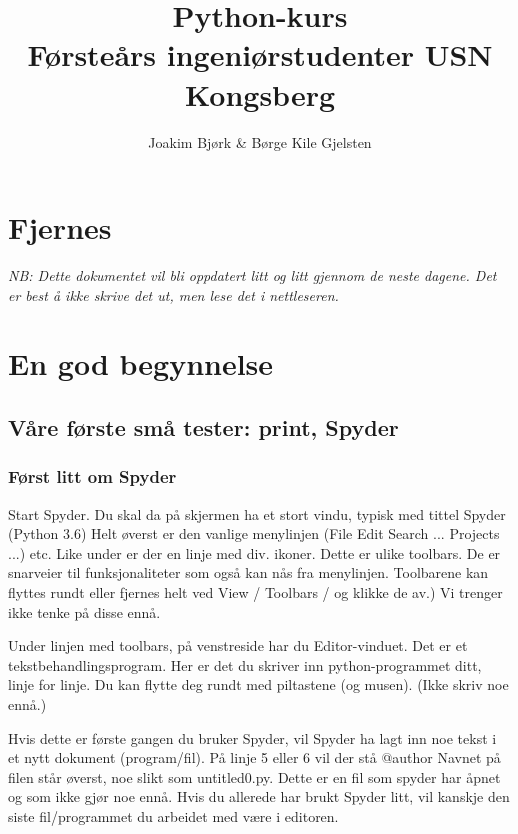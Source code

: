 \documentclass[a4paper,11pt,utf8]{book}
\begin{document}
\title{Python-kurs\\
Førsteårs ingeniørstudenter USN Kongsberg}
\author{Joakim Bjørk \& Børge Kile Gjelsten}
\maketitle
\newpage
\tableofcontents
\newpage


\newpage

\section*{Fjernes}
{\em
NB: Dette dokumentet vil bli oppdatert litt og litt gjennom de neste dagene.
Det er best å ikke skrive det ut, men lese det i nettleseren.

\bigskip
}

\section{En god begynnelse}
\subsection{Våre første små tester: print, Spyder}
\subsubsection*{Først litt om Spyder}
Start Spyder. Du skal da på skjermen ha et stort vindu, typisk med tittel Spyder (Python 3.6)
Helt øverst er den vanlige menylinjen (File Edit Search ... Projects ...) etc.
Like under er der en linje med div. ikoner. Dette er ulike toolbars.
De er snarveier til funksjonaliteter som også kan nås fra menylinjen. 
Toolbarene kan flyttes rundt eller fjernes helt ved View / Toolbars / og klikke de av.)
Vi trenger ikke tenke på disse ennå. 

Under linjen med toolbars, på venstreside har du Editor-vinduet.
Det er et tekstbehandlingsprogram. 
Her er det du skriver inn python-programmet ditt, linje for linje.
Du kan flytte deg rundt med piltastene (og musen).
(Ikke skriv noe ennå.) 

Hvis dette er første gangen du bruker Spyder, vil Spyder ha lagt inn noe tekst
i et nytt dokument (program/fil).
På linje 5 eller 6 vil der stå @author 
Navnet på filen står øverst, noe slikt som untitled0.py. 
Dette er en fil som spyder har åpnet og som ikke gjør noe ennå. 
Hvis du allerede har brukt Spyder litt, vil kanskje den siste fil/programmet
du arbeidet med være i editoren.
\end{document}
